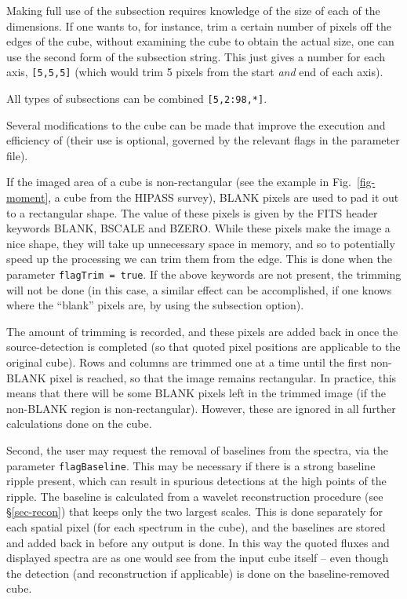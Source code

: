 Making full use of the subsection requires knowledge of the size of
each of the dimensions. If one wants to, for instance, trim a certain
number of pixels off the edges of the cube, without examining the cube
to obtain the actual size, one can use the second form of the
subsection string. This just gives a number for each axis, \eg
\texttt{[5,5,5]} (which would trim 5 pixels from the start \emph{and}
end of each axis).

All types of subsections can be combined \eg \texttt{[5,2:98,*]}. 


\label{sec-modify}

Several modifications to the cube can be made that improve the
execution and efficiency of \duchamp (their use is optional, governed
by the relevant flags in the parameter file).

\label{sec-blank}

If the imaged area of a cube is non-rectangular (see the example in
Fig.~\ref{fig-moment}, a cube from the HIPASS survey), BLANK pixels
are used to pad it out to a rectangular shape. The value of these
pixels is given by the FITS header keywords BLANK, BSCALE and
BZERO. While these pixels make the image a nice shape, they will take
up unnecessary space in memory, and so to potentially speed up the
processing we can trim them from the edge. This is done when the
parameter \texttt{flagTrim = true}. If the above keywords are not
present, the trimming will not be done (in this case, a similar effect
can be accomplished, if one knows where the ``blank'' pixels are, by
using the subsection option).

The amount of trimming is recorded, and these pixels are added back in
once the source-detection is completed (so that quoted pixel positions
are applicable to the original cube). Rows and columns are trimmed one
at a time until the first non-BLANK pixel is reached, so that the
image remains rectangular. In practice, this means that there will be
some BLANK pixels left in the trimmed image (if the non-BLANK region
is non-rectangular). However, these are ignored in all further
calculations done on the cube.


Second, the user may request the removal of baselines from the
spectra, via the parameter \texttt{flagBaseline}. This may be
necessary if there is a strong baseline ripple present, which can
result in spurious detections at the high points of the ripple. The
baseline is calculated from a wavelet reconstruction procedure (see
\S\ref{sec-recon}) that keeps only the two largest scales. This is
done separately for each spatial pixel (\ie for each spectrum in the
cube), and the baselines are stored and added back in before any
output is done. In this way the quoted fluxes and displayed spectra
are as one would see from the input cube itself -- even though the
detection (and reconstruction if applicable) is done on the
baseline-removed cube.

